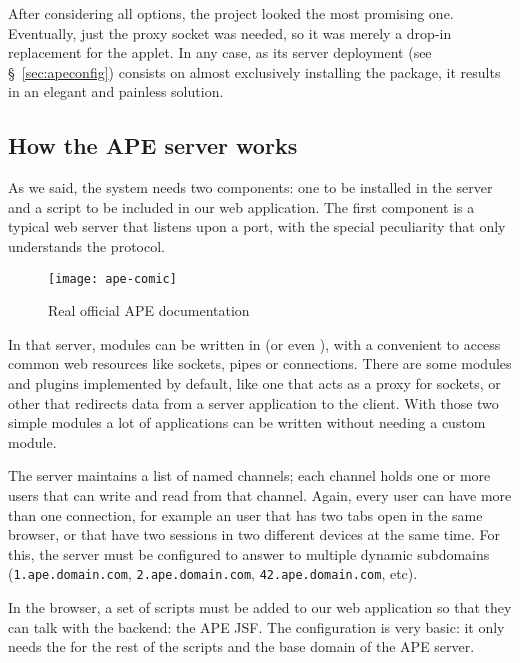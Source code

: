 After considering all options, the  project looked the most promising one.
Eventually, just the proxy socket was needed, so it was merely a drop-in replacement for the  applet.
In any case, as its server deployment (see \S~\ref{sec:apeconfig}) consists on almost exclusively installing the   package, it results in an elegant and painless solution.


\subsection{How the APE server works} %
\label{sub:how_the_ape_server_works}

As we said, the system needs two components: one to be installed in the server and a script to be included in our web application.
The first component is a typical web server that listens upon a port, with the special peculiarity that only understands the  protocol.

\begin{wrapfigure}{r}{0.5\textwidth}
  \centering
    \texttt{[image: ape-comic]}
  \caption{Real official APE documentation}
  \label{fig:ape-comic}
\end{wrapfigure}

In that server, modules can be written in  (or even ), with a convenient  to access common web resources like sockets, pipes or  connections.
There are some modules and plugins implemented by default, like one that acts as a proxy for  sockets, or other that redirects data from a server application to the client.
With those two simple modules a lot of applications can be written without needing a custom module.

The server maintains a list of named channels; each channel holds one or more users that can write and read from that channel.
Again, every user can have more than one connection, for example an user that has two tabs open in the same browser, or that have two sessions in two different devices at the same time.
For this, the server  must be configured to answer to multiple dynamic subdomains  (\verb|1.ape.domain.com|, \verb|2.ape.domain.com|, \verb|42.ape.domain.com|, etc).

In the browser, a set of scripts must be added to our web application so that they can talk with the backend: the \ac{APE} \ac{JSF}.
The configuration is very basic: it only needs the  for the rest of the scripts and the base domain of the \ac{APE} server.

